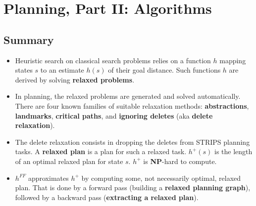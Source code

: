 \documentclass[conference, a4paper]{styles/acmsiggraph}
\begin{document}
\section{Planning, Part II: Algorithms}
    \subsection{Summary}
        \begin{itemize}
            \item Heuristic search on classical search problems relies on a function $h$ mapping states $s$ to an estimate $h(s)$ of their goal distance. 
            Such functions $h$ are derived by solving \textbf{relaxed problems}.
            \item In planning, the relaxed problems are generated and solved automatically.
            There are four known families of suitable relaxation methods: 
            \textbf{abstractions}, \textbf{landmarks}, \textbf{critical paths}, and \textbf{ignoring deletes} (aka \textbf{delete relaxation}).
            \item The delete relaxation consists in dropping the deletes from STRIPS planning tasks. 
            A \textbf{relaxed plan} is a plan for such a relaxed task. 
            $h^+(s)$ is the length of an optimal relaxed plan for state $s$. 
            $h^+$ is \textbf{NP}-hard to compute.
            \item $h^{FF}$ approximates $h^+$ by computing some, not necessarily optimal, relaxed plan. 
            That is done by a forward pass (building a \textbf{relaxed planning graph}), followed by a backward pass (\textbf{extracting a relaxed plan}).
        \end{itemize}
    
    
    
    
    
    
    
    
    
    
    
    
    
    
    
    
    
    
    
\end{document}

